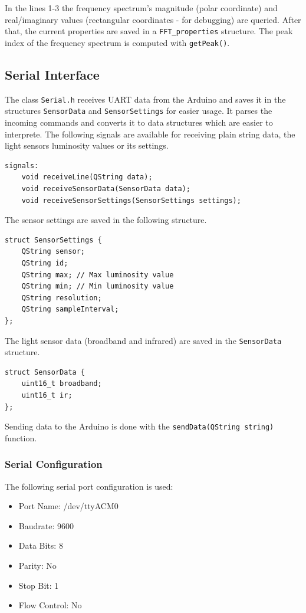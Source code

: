 \documentclass[notitlepage]{scrreprt}
\begin{document}
In the lines 1-3 the frequency spectrum's magnitude (polar coordinate) and real/imaginary values (rectangular coordinates - for debugging) are queried. After that, the current properties are saved in a \lstinline$FFT_properties$ structure. The peak index of the frequency spectrum is computed with \lstinline$getPeak()$.

\subsection{Serial Interface}
The class \lstinline$Serial.h$ receives UART data from the Arduino and saves it in the structures \lstinline$SensorData$ and \lstinline$SensorSettings$ for easier usage. It parses the incoming commands and converts it to data structures which are easier to interprete. The following signals are available for receiving plain string data, the light sensors luminosity values or its settings.

\begin{lstlisting}
signals:
    void receiveLine(QString data);
    void receiveSensorData(SensorData data);
    void receiveSensorSettings(SensorSettings settings);
\end{lstlisting}

The sensor settings are saved in the following structure.

\begin{lstlisting}
struct SensorSettings {
    QString sensor;
    QString id;
    QString max; // Max luminosity value
    QString min; // Min luminosity value
    QString resolution;
    QString sampleInterval;
};
\end{lstlisting}

The light sensor data (broadband and infrared) are saved in the \lstinline$SensorData$ structure.

\begin{lstlisting}
struct SensorData {
	uint16_t broadband;
	uint16_t ir;
};
\end{lstlisting}

Sending data to the Arduino is done with the \lstinline$sendData(QString string)$ function.

\subsubsection{Serial Configuration}
The following serial port configuration is used:
\begin{itemize}
	\item{Port Name: /dev/ttyACM0}
	\item{Baudrate: 9600}
	\item{Data Bits: 8}
	\item{Parity: No}
	\item{Stop Bit: 1}
	\item{Flow Control: No}
\end{itemize}
\end{document}
